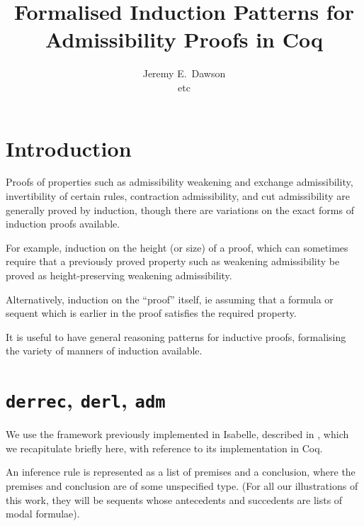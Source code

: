 \documentclass[a4paper,12pt]{llncs}
\begin{document}
\title{Formalised Induction Patterns for Admissibility Proofs in Coq}

\author{Jeremy E.\ Dawson\\
etc}

\maketitle


\section{Introduction}

Proofs of properties such as admissibility 
weakening and exchange admissibility,
invertibility of certain rules,
contraction admissibility, and cut admissibility
are generally proved by induction, though there are variations
on the exact forms of induction proofs available.

For example, induction on the height (or size) of a proof,
which can sometimes require that a previously proved property such as
weakening admissibility be proved as height-preserving weakening admissibility.

Alternatively, induction on the ``proof'' itself, ie assuming that
a formula or sequent which is earlier in the proof satisfies the required
property.

It is useful to have general reasoning patterns for inductive proofs,
formalising the variety of manners of induction available.

\section{\texttt{derrec}, \texttt{derl}, \texttt{adm}}\label{s-dda}
We use the framework previously implemented in Isabelle,
described in \cite[Appendix A.1]{dawson-gore-gls},
which we recapitulate briefly here, with reference to its implementation in
Coq.

An inference rule is represented as a list of premises and a conclusion,
where the premises and conclusion are of some unspecified type.
(For all our illustrations of this work, they will be sequents whose
antecedents and succedents are lists of modal formulae).
\end{document}
